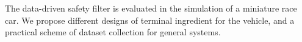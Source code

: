 The data-driven safety filter is evaluated in the simulation of a miniature race car.
We propose different designs of terminal ingredient for the vehicle, and a practical scheme of dataset collection for general systems.

 \cleardoublepage







